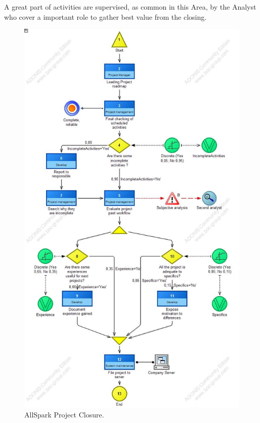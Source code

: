 A great part of activities are supervised, as common in this Area, by the Analyst who cover a important role to gather best value from the closing.

\begin{figure}[ht!]
\begin{centering}
\includegraphics[scale=0.50]{assign2/adonis/imgs/closure.jpg}
\caption{AllSpark Project Closure.}
\label{2img:closure}
\end{centering}
\end{figure}



